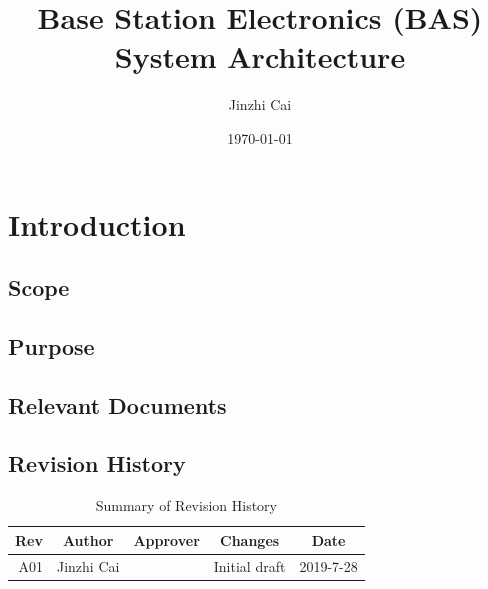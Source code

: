 \documentclass[12pt,article]{memoir}
\title{Base Station Electronics (BAS) System Architecture}
\author{Jinzhi Cai}
\date{\today}
\begin{document}
	


\tableofcontents*
\clearpage


\chapter{Introduction}
\section{Scope}

\section{Purpose}

\section{Relevant Documents}

\section{Revision History}
\begin{table}[H]
	\centering
	\begin{tabu}{r || c | c | c | c }
		Rev & Author & Approver & Changes & Date\\ \hline
		A01 & Jinzhi Cai & & Initial draft & 2019-7-28\\
	\end{tabu}
	\caption{Summary of Revision History}
	\label{tab:rev}
\end{table}
\newpage
\end{document}
